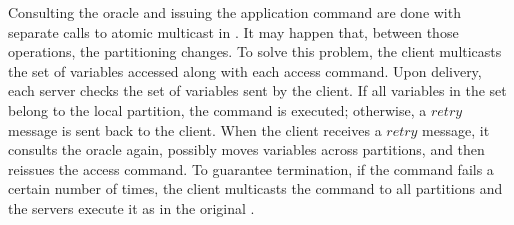 Consulting the oracle and issuing the application command are done with separate calls to atomic multicast in \dssmr{}.
It may happen that, between those operations, the partitioning changes.
To solve this problem, the client multicasts the set of variables accessed along with each access command.
Upon delivery, each server checks the set of variables sent by the client.
If all variables in the set belong to the local partition, the command is executed; otherwise, a $retry$ message is sent back to the client.
When the client receives a $retry$ message, it consults the oracle again, possibly moves variables across partitions, and then reissues the access command.
To guarantee termination, if the command fails a certain number of times, the client multicasts the command to all partitions and the servers execute it as in the original \ssmr{}.

